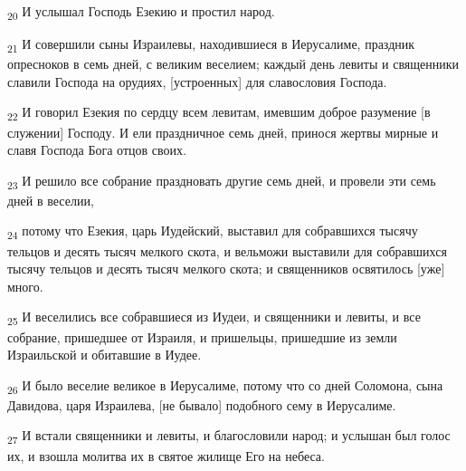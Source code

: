 \begin{tcolorbox}
\textsubscript{20} И услышал Господь Езекию и простил народ.
\end{tcolorbox}
\begin{tcolorbox}
\textsubscript{21} И совершили сыны Израилевы, находившиеся в Иерусалиме, праздник опресноков в семь дней, с великим веселием; каждый день левиты и священники славили Господа на орудиях, [устроенных] для славословия Господа.
\end{tcolorbox}
\begin{tcolorbox}
\textsubscript{22} И говорил Езекия по сердцу всем левитам, имевшим доброе разумение [в служении] Господу. И ели праздничное семь дней, принося жертвы мирные и славя Господа Бога отцов своих.
\end{tcolorbox}
\begin{tcolorbox}
\textsubscript{23} И решило все собрание праздновать другие семь дней, и провели эти семь дней в веселии,
\end{tcolorbox}
\begin{tcolorbox}
\textsubscript{24} потому что Езекия, царь Иудейский, выставил для собравшихся тысячу тельцов и десять тысяч мелкого скота, и вельможи выставили для собравшихся тысячу тельцов и десять тысяч мелкого скота; и священников освятилось [уже] много.
\end{tcolorbox}
\begin{tcolorbox}
\textsubscript{25} И веселились все собравшиеся из Иудеи, и священники и левиты, и все собрание, пришедшее от Израиля, и пришельцы, пришедшие из земли Израильской и обитавшие в Иудее.
\end{tcolorbox}
\begin{tcolorbox}
\textsubscript{26} И было веселие великое в Иерусалиме, потому что со дней Соломона, сына Давидова, царя Израилева, [не бывало] подобного сему в Иерусалиме.
\end{tcolorbox}
\begin{tcolorbox}
\textsubscript{27} И встали священники и левиты, и благословили народ; и услышан был голос их, и взошла молитва их в святое жилище Его на небеса.
\end{tcolorbox}
